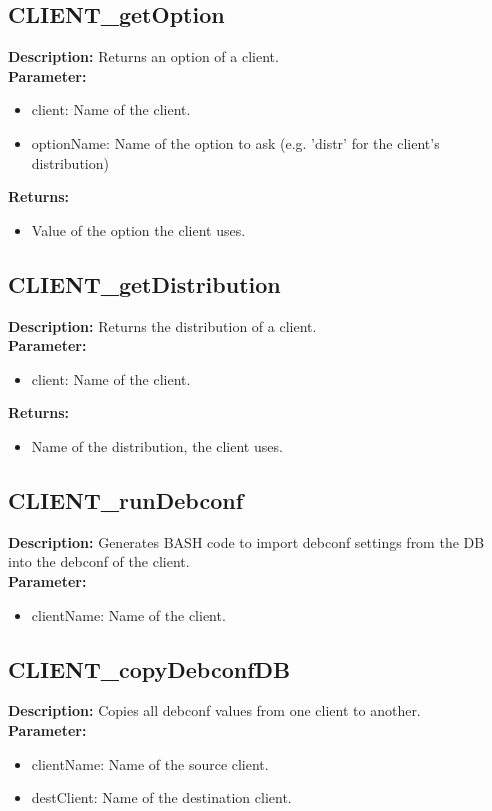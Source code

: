 \subsection{CLIENT\_getOption}
\textbf{Description:} Returns an option of a client.\\
\textbf{Parameter:}
\begin{itemize}
\item client: Name of the client.
\item optionName: Name of the option to ask (e.g. 'distr' for the client's distribution)
\end{itemize}
\textbf{Returns:}
\begin{itemize}
\item Value of the option the client uses.
\end{itemize}

\subsection{CLIENT\_getDistribution}
\textbf{Description:} Returns the distribution of a client.\\
\textbf{Parameter:}
\begin{itemize}
\item client: Name of the client.
\end{itemize}
\textbf{Returns:}
\begin{itemize}
\item Name of the distribution, the client uses.
\end{itemize}

\subsection{CLIENT\_runDebconf}
\textbf{Description:} Generates BASH code to import debconf settings from the DB into the debconf of the client.\\
\textbf{Parameter:}
\begin{itemize}
\item clientName: Name of the client.
\end{itemize}

\subsection{CLIENT\_copyDebconfDB}
\textbf{Description:} Copies all debconf values from one client to another.\\
\textbf{Parameter:}
\begin{itemize}
\item clientName: Name of the source client.
\item destClient: Name of the destination client.
\end{itemize}

